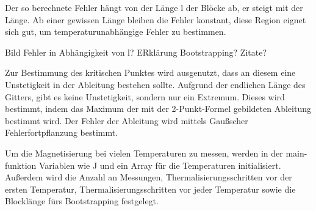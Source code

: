 \documentclass{scrreprt}
\begin{document}
	
	Der so berechnete Fehler hängt von der Länge l der Blöcke ab, er steigt mit der Länge. Ab einer gewissen Länge bleiben die Fehler konstant, diese Region eignet sich gut, um temperaturunabhängige Fehler zu bestimmen.
	
	Bild Fehler in Abhängigkeit von l? ERklärung Bootstrapping? Zitate?
	
	Zur Bestimmung des kritischen Punktes wird ausgenutzt, dass an diesem eine Unstetigkeit in der Ableitung bestehen sollte. Aufgrund der endlichen Länge des Gitters, gibt es keine Unstetigkeit, sondern nur ein Extremum. Dieses wird bestimmt, indem das Maximum der mit der 2-Punkt-Formel gebildeten Ableitung bestimmt wird. Der Fehler der Ableitung wird mittels Gaußscher Fehlerfortpflanzung bestimmt.
		
	Um die Magnetisierung bei vielen Temperaturen zu messen, werden in der main-funktion Variablen wie J und ein Array für die Temperaturen initialisiert. Außerdem wird die Anzahl an Messungen, Thermalisierungsschritten vor der ersten Temperatur, Thermalisierungsschritten vor jeder Temperatur sowie die Blocklänge fürs Bootstrapping festgelegt. 	
	
\end{document}
